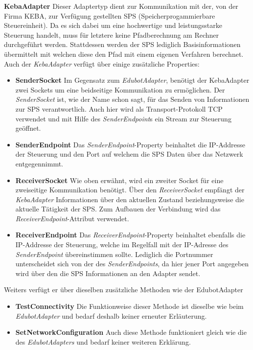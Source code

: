 \textbf{KebaAdapter}
\newline
Dieser Adaptertyp dient zur Kommunikation mit der, von der Firma KEBA, zur Verfügung gestellten SPS (Speicherprogammierbare Steuereinheit). Da es sich dabei um eine hochwertige und leistungsstarke Steuerung handelt, muss für letztere keine Pfadberechnung am Rechner durchgeführt werden. Stattdessen werden der SPS lediglich Basisinformationen übermittelt mit welchen diese den Pfad mit einem eigenen Verfahren berechnet. Auch der \textit{KebaAdapter} verfügt über einige zusätzliche Properties:
\begin{itemize}
\item \textbf{SenderSocket}
\newline
Im Gegensatz zum \textit{EdubotAdapter}, benötigt der KebaAdapter zwei Sockets um eine beidseitige Kommunikation zu ermöglichen. Der \textit{SenderSocket} ist, wie der Name schon sagt, für das Senden von Informationen zur SPS verantwortlich. Auch hier wird als Transport-Protokoll TCP verwendet und mit Hilfe des \textit{SenderEndpoint}s ein Stream zur Steuerung geöffnet. 
\item \textbf{SenderEndpoint}
\newline
Das \textit{SenderEndpoint}-Property beinhaltet die IP-Addresse der Steuerung und den Port auf welchem die SPS Daten über das Netzwerk entgegennimmt. 
\item \textbf{ReceiverSocket}
\newline
Wie oben erwähnt, wird ein zweiter Socket für eine zweiseitige Kommunikation benötigt. Über den \textit{ReceiverSocket} empfängt der \textit{KebaAdapter} Informationen über den aktuellen Zustand beziehungsweise die aktuelle Tätigkeit der SPS. Zum Aufbauen der Verbindung wird das \textit{ReceiverEndpoint}-Attribut verwendet.
\item \textbf{ReceiverEndpoint}
\newline
Das \textit{ReceiverEndpoint}-Property beinhaltet ebenfalls die IP-Addresse der Steuerung, welche im Regelfall mit der IP-Adresse des \textit{SenderEndpoint} übereinstimmen sollte. Lediglich die Portnummer unterscheidet sich von der des \textit{SenderEndpoints}, da hier jener Port angegeben wird über den die SPS Informationen an den Adapter sendet.
\end{itemize}

Weiters verfügt er über dieselben zusätzliche Methoden wie der EdubotAdapter
\begin{itemize}
\item \textbf{TestConnectivity}
\newline
Die Funktionweise dieser Methode ist dieselbe wie beim \textit{EdubotAdapter} und bedarf deshalb keiner erneuter Erläuterung.
\item \textbf{SetNetworkConfiguration}
\newline
Auch diese Methode funktioniert gleich wie die des \textit{EdubotAdapters} und bedarf keiner weiteren Erklärung.
\end{itemize}


